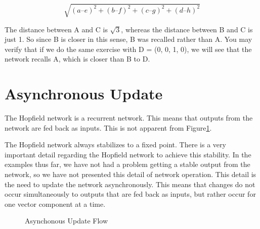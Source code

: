 \documentclass[12pt, right open]{memoir}
\begin{document}
\[\sqrt{(a – e)^2 + (b – f)^2 + (c – g)^2 + (d – h)^2}\]

The distance between A and C is $\sqrt{3}$, whereas the distance between B and
C is just 1. So since B is closer in this sense, B was recalled rather than A. You
may verify that if we do the same exercise with D = (0, 0, 1, 0), we will see
that the network recalls A, which is closer than B to D.


\section{Asynchronous Update}

The Hopfield network is a recurrent network. This means that outputs from
the network are fed back as inputs. This is not apparent from Figure\ref{fig:asynchonous_update_flow}.

The Hopfield network always stabilizes to a fixed point. There is a very
important detail regarding the Hopfield network to achieve this stability. In the
examples thus far, we have not had a problem getting a stable output from the
network, so we have not presented this detail of network operation. This detail
is the need to update the network asynchronously. This means that changes do
not occur simultaneously to outputs that are fed back as inputs, but rather
occur for one vector component at a time.

\begin{figure}[!ht] %
\caption{Asynchonous Update Flow}
\label{fig:asynchonous_update_flow}
\centering
{}
\end{figure}
\end{document}

